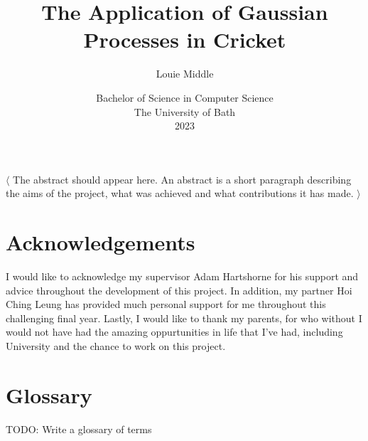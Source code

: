 \documentclass[12pt,a4paper]{report}
\title{\bf The Application of Gaussian Processes in Cricket}
\author{Louie Middle}
\date{Bachelor of Science in Computer Science\\ 
      The University of Bath\\
      2023}
\theoremstyle{definition}
\begin{document}
\hypersetup{pageanchor=false}	

\lstset{language=Java,breaklines,breakatwhitespace,basicstyle=\small}

\setcounter{page}{0}

\maketitle
\newpage

\newpage

\newpage

\hypersetup{pageanchor=true}

\abstract
$\langle$
The abstract should appear here. 
An abstract is a short paragraph describing the aims of the project, what was achieved and what contributions it has made.
$\rangle$
\newpage

\tableofcontents
\newpage

\listoffigures
\newpage

\listoftables
\newpage

\listofalgorithms
\newpage

\chapter*{Acknowledgements}

I would like to acknowledge my supervisor Adam Hartshorne for his support and advice throughout the development of this project.  
In addition, my partner Hoi Ching Leung has provided much personal support for me throughout this challenging final year.
Lastly, I would like to thank my parents, for who without I would not have had the amazing oppurtunities in life that I've had, including University and the chance to work on this project.

\newpage

\chapter*{Glossary}
TODO: Write a glossary of terms
\end{document}
